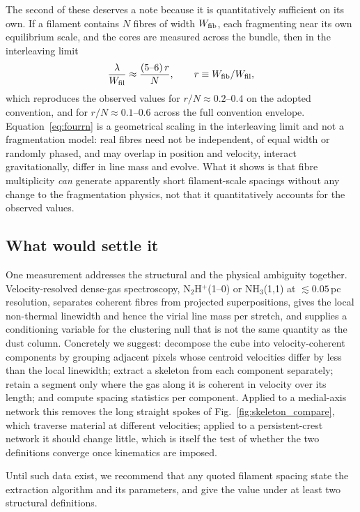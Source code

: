 \documentclass[usenatbib,twoside,twocolumn]{mnras}
\begin{document}
The second of these deserves a note because it is quantitatively sufficient on its own. If a filament contains $N$ fibres of width $W_{\rm fib}$, each fragmenting near its own equilibrium scale, and the cores are measured across the bundle, then in the interleaving limit
\begin{equation}
\frac{\lambda}{W_{\rm fil}}\approx\frac{(5\text{--}6)\,r}{N},\qquad r\equiv W_{\rm fib}/W_{\rm fil},
\label{eq:fourrn}
\end{equation}
which reproduces the observed values for $r/N\approx0.2$--$0.4$ on the adopted convention, and for $r/N\approx0.1$--$0.6$ across the full convention envelope. Equation~\ref{eq:fourrn} is a geometrical scaling in the interleaving limit and not a fragmentation model: real fibres need not be independent, of equal width or randomly phased, and may overlap in position and velocity, interact gravitationally, differ in line mass and evolve. What it shows is that fibre multiplicity \emph{can} generate apparently short filament-scale spacings without any change to the fragmentation physics, not that it quantitatively accounts for the observed values.

\subsection{What would settle it}

One measurement addresses the structural and the physical ambiguity together. Velocity-resolved dense-gas spectroscopy, N$_2$H$^+$(1--0) or NH$_3$(1,1) at $\lesssim0.05$\,pc resolution, separates coherent fibres from projected superpositions, gives the local non-thermal linewidth and hence the virial line mass per stretch, and supplies a conditioning variable for the clustering null that is not the same quantity as the dust column. Concretely we suggest: decompose the cube into velocity-coherent components by grouping adjacent pixels whose centroid velocities differ by less than the local linewidth; extract a skeleton from each component separately; retain a segment only where the gas along it is coherent in velocity over its length; and compute spacing statistics per component. Applied to a medial-axis network this removes the long straight spokes of Fig.~\ref{fig:skeleton_compare}, which traverse material at different velocities; applied to a persistent-crest network it should change little, which is itself the test of whether the two definitions converge once kinematics are imposed.

Until such data exist, we recommend that any quoted filament spacing state the extraction algorithm and its parameters, and give the value under at least two structural definitions.
\end{document}
